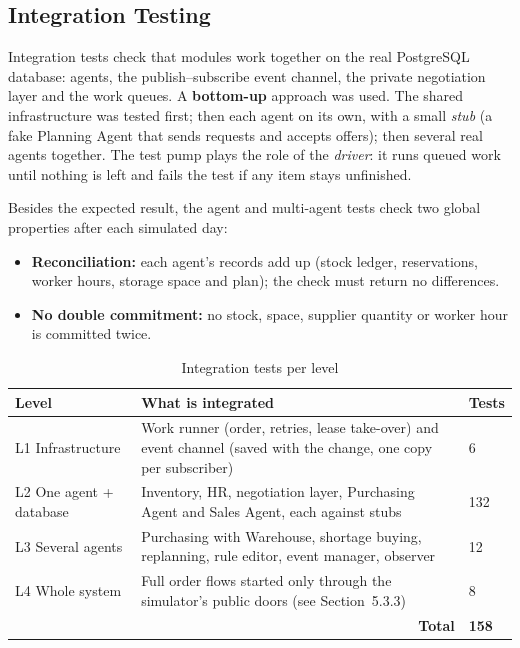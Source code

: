 \subsection{Integration Testing}

Integration tests check that modules work together on the real PostgreSQL database: agents, the publish--subscribe
event channel, the private negotiation layer and the work queues. A \textbf{bottom-up} approach was used. The shared
infrastructure was tested first; then each agent on its own, with a small \emph{stub} (a fake Planning Agent that sends
requests and accepts offers); then several real agents together. The test pump plays the role of the \emph{driver}: it
runs queued work until nothing is left and fails the test if any item stays unfinished.

Besides the expected result, the agent and multi-agent tests check two global properties after each simulated day:
\begin{itemize}
  \item \textbf{Reconciliation:} each agent's records add up (stock ledger, reservations, worker hours, storage space
        and plan); the check must return no differences.
  \item \textbf{No double commitment:} no stock, space, supplier quantity or worker hour is committed twice.
\end{itemize}

\begin{table}[h]
\centering
\small
\renewcommand{\arraystretch}{1.2}
\begin{tabular}{|p{}|p{}|p{}|}
\hline
\textbf{Level} & \textbf{What is integrated} & \textbf{Tests} \\ \hline
L1 Infrastructure & Work runner (order, retries, lease take-over) and event channel (saved with the change, one copy per subscriber) & 6 \\ \hline
L2 One agent + database & Inventory, HR, negotiation layer, Purchasing Agent and Sales Agent, each against stubs & 132 \\ \hline
L3 Several agents & Purchasing with Warehouse, shortage buying, replanning, rule editor, event manager, observer & 12 \\ \hline
L4 Whole system & Full order flows started only through the simulator's public doors (see Section~5.3.3) & 8 \\ \hline
\multicolumn{2}{|r|}{\textbf{Total}} & \textbf{158} \\ \hline
\end{tabular}
\caption{Integration tests per level}
\label{tab:int-summary}
\end{table}

